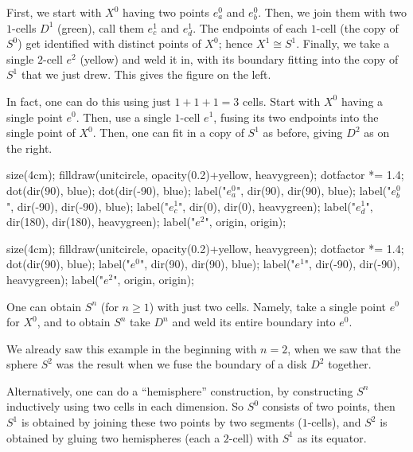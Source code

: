 \begin{example}
	\listhack
	\begin{enumerate}[(a)]
	\ii First, we start with $X^0$ having two points $e_a^0$ and $e_b^0$.
	Then, we join them with two $1$-cells $D^1$ (green),
	call them $e_c^1$ and $e_d^1$.
	The endpoints of each $1$-cell (the copy of $S^0$) get identified
	with distinct points of $X^0$; hence $X^1 \cong S^1$.
	Finally, we take a single $2$-cell $e^2$ (yellow) and weld it in,
	with its boundary fitting into the copy of $S^1$ that we just drew.
	This gives the figure on the left.

	\ii In fact, one can do this using just $1+1+1=3$ cells.
	Start with $X^0$ having a single point $e^0$.
	Then, use a single $1$-cell $e^1$, fusing its two endpoints
	into the single point of $X^0$.
	Then, one can fit in a copy of $S^1$ as before,
	giving $D^2$ as on the right.
	\end{enumerate}
	\begin{center}
		\begin{asy}
			size(4cm);
			filldraw(unitcircle, opacity(0.2)+yellow, heavygreen);
			dotfactor *= 1.4;
			dot(dir(90), blue);
			dot(dir(-90), blue);
			label("$e_a^0$", dir(90), dir(90), blue);
			label("$e_b^0$", dir(-90), dir(-90), blue);
			label("$e_c^1$", dir(0), dir(0), heavygreen);
			label("$e_d^1$", dir(180), dir(180), heavygreen);
			label("$e^2$", origin, origin);
		\end{asy}
		\qquad
		\begin{asy}
			size(4cm);
			filldraw(unitcircle, opacity(0.2)+yellow, heavygreen);
			dotfactor *= 1.4;
			dot(dir(90), blue);
			label("$e^0$", dir(90), dir(90), blue);
			label("$e^1$", dir(-90), dir(-90), heavygreen);
			label("$e^2$", origin, origin);
		\end{asy}
	\end{center}
\end{example}

\begin{example}
	[$S^n$ as a CW complex]
	\listhack
	\begin{enumerate}[(a)]
		\ii One can obtain $S^n$ (for $n \ge 1$) with just two cells.
		Namely, take a single point $e^0$ for $X^0$, and to obtain $S^n$
		take $D^n$ and weld its entire boundary into $e^0$.

		We already saw this example in the beginning with $n=2$,
		when we saw that the sphere $S^2$ was the result when we fuse
		the boundary of a disk $D^2$ together.

		\ii Alternatively, one can do a ``hemisphere'' construction,
		by constructing $S^n$ inductively using two cells in each dimension.
		So $S^0$ consists of two points, then $S^1$ is obtained
		by joining these two points by two segments ($1$-cells),
		and $S^2$ is obtained by gluing two hemispheres (each a $2$-cell)
		with $S^1$ as its equator.
	\end{enumerate}
\end{example}

